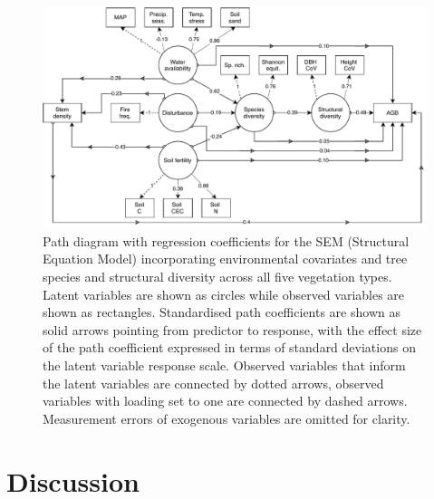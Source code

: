 \begin{refsection}
\begin{figure}[tb]
\centering
	\includegraphics[width=\textwidth]{img/full.drawio}
	\caption[Path diagram of full Structural Equation Model]{Path diagram with regression coefficients for the SEM (Structural Equation Model) incorporating environmental covariates and tree species and structural diversity across all five vegetation types. Latent variables are shown as circles while observed variables are shown as rectangles. Standardised path coefficients are shown as solid arrows pointing from predictor to response, with the effect size of the path coefficient expressed in terms of standard deviations on the latent variable response scale. Observed variables that inform the latent variables are connected by dotted arrows, observed variables with loading set to one are connected by dashed arrows. Measurement errors of exogenous variables are omitted for clarity.}
	\label{befr:full_mod}
\end{figure}

\section{Discussion}
\label{befr:sec:discussion}


\end{refsection}
